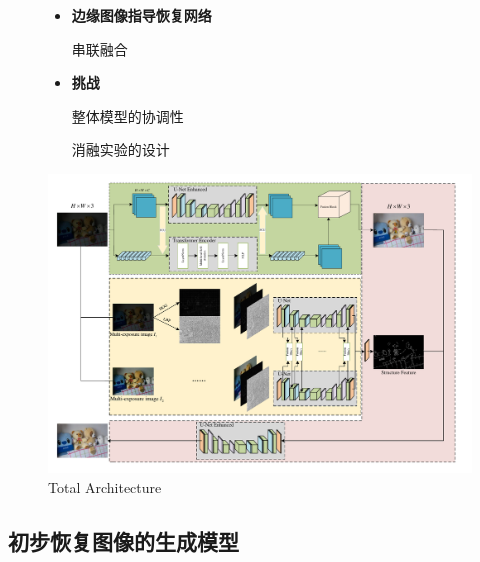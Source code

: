 \documentclass[CJK,aspectratio=169]{beamer}  %
\begin{document}
\begin{frame}
\begin{figure}
\begin{minipage}{.4\columnwidth}
\begin{itemize}
					{ 多曝光架构}
					
					{ 融合HOG和LBP图像}
					
					
					\item \textbf{边缘图像指导恢复网络}
					
					{ 串联融合}
					
					\item \textbf{挑战}
					
					{ 整体模型的协调性}
					
					{ 消融实验的设计}
				\end{itemize}
			\end{minipage}
			\begin{minipage}{.58\columnwidth}
				\setlength{\abovecaptionskip}{-0.05cm}
				\centering 
				\includegraphics[width=\textwidth]{picture/LLIE/My Architecture/Total architecture}
				\captionsetup{font=scriptsize}
				\caption{
					\label{fig: Total architecture}
					Total Architecture
				}
			\end{minipage}
		\end{figure}
		
	\end{frame}
	
	
	\subsection{初步恢复图像的生成模型}
	
\end{document}
